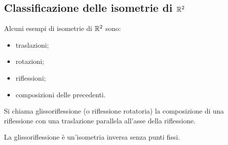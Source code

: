 	\subsection{Classificazione delle isometrie di $\mathbb R^2$}
 
 Alcuni esempi di isometrie di $\mathbb R^2$ sono:
 \begin{itemize}
	\item traslazioni;
	\item rotazioni;
	\item riflessioni;
	\item composizioni delle precedenti.
 \end{itemize}
 
 \begin{definition}
 Si chiama glissoriflessione (o riflessione rotatoria) la composizione di una riflessione con una traslazione parallela
 all'asse della riflessione.
 \end{definition}
 
 \begin{remark}
 La glissoriflessione è un'isometria inversa senza punti fissi.
 \end{remark}
 

